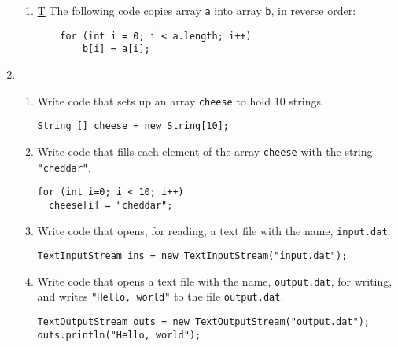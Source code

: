 \begin{enumerate}
\begin{enumerate}
            \item \underline{T} The following code copies array {\tt a}
                into array {\tt b}, in reverse order:
\begin{verbatim}
    for (int i = 0; i < a.length; i++)
        b[i] = a[i];
\end{verbatim}

\end{enumerate}


        \item 
            \begin{enumerate}
            	\item Write code that sets up an array {\tt cheese} to hold 
		    10 strings.
		    
\begin{verbatim}
String [] cheese = new String[10];
\end{verbatim}		    
            	   
            	\item Write code that fills each element of the array 
                    {\tt cheese} with the string {\tt "cheddar"}.
		    
\begin{verbatim}
for (int i=0; i < 10; i++)
  cheese[i] = "cheddar";
\end{verbatim}		    
            	   
           	    
            	\item Write code that opens, for reading, a text 
		    file with the name, {\tt input.dat}.
		    
\begin{verbatim}
TextInputStream ins = new TextInputStream("input.dat");
\end{verbatim}		    
            	   

            	    
            	\item Write code that opens a text file with the name, 
                    {\tt output.dat}, for writing, and writes 
                    {\tt "Hello, world"} to the file {\tt output.dat}.
		    
\begin{verbatim}
TextOutputStream outs = new TextOutputStream("output.dat");
outs.println("Hello, world");
\end{verbatim}		    
            	   
            	    
            \end{enumerate}




\end{enumerate}

